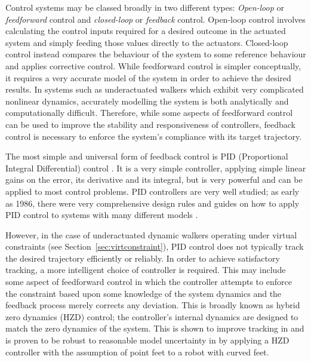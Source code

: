 Control systems may be classed broadly in two different types: \textit{Open-loop} or \textit{feedforward} control and \textit{closed-loop} or \textit{feedback} control. Open-loop control involves calculating the control inputs required for a desired outcome in the actuated system and simply feeding those values directly to the actuators. Closed-loop control instead compares the behaviour of the system to some reference behaviour and applies corrective control. While feedforward control is simpler conceptually, it requires a very accurate model of the system in order to achieve the desired results. In systems such as underactuated walkers which exhibit very complicated nonlinear dynamics, accurately modelling the system is both analytically and computationally difficult. Therefore, while some aspects of feedforward control can be used to improve the stability and responsiveness of controllers, feedback control is necessary to enforce the system's compliance with its target trajectory.

The most simple and universal form of feedback control is PID (Proportional Integral Differential) control \cite{aastrom2001future}. It is a very simple controller, applying simple linear gains on the error, its derivative and its integral, but is very powerful and can be applied to most control problems. PID controllers are very well studied; as early as 1986, there were very comprehensive design rules and guides on how to apply PID control to systems with many different models \cite{rivera1986internal}. %

However, in the case of underactuated dynamic walkers operating under virtual constraints (see Section~\ref{sec:virtconstraint}), PID control does not typically track the desired trajectory efficiently or reliably. In order to achieve satisfactory tracking, a more intelligent choice of controller is required. This may include some aspect of feedforward control in which the controller attempts to enforce the constraint based upon some knowledge of the system dynamics and the feedback process merely corrects any deviation. This is broadly known as hybrid zero dynamics (HZD) control; the controller's internal dynamics are designed to match the zero dynamics of the system. This is shown to improve tracking in \cite{sreenath2011compliant} and is proven to be robust to reasonable model uncertainty in \cite{martin2014design} by applying a HZD controller with the assumption of point feet to a robot with curved feet. 

